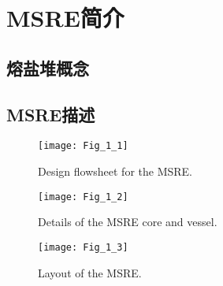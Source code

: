 \chapter{MSRE简介}

\section{熔盐堆概念}

\section{MSRE描述}

\begin{figure}
\centering
\texttt{[image: Fig\_1\_1]}
\caption{Design flowsheet for the MSRE.}
\label{Fig_1_1}
\end{figure}

\begin{figure}
\centering
\texttt{[image: Fig\_1\_2]}
\caption{Details of the MSRE core and vessel.}
\label{Fig_1_2}
\end{figure}

\begin{figure}
\centering
\texttt{[image: Fig\_1\_3]}
\caption{Layout of the MSRE.}
\label{Fig_1_3}
\end{figure}
